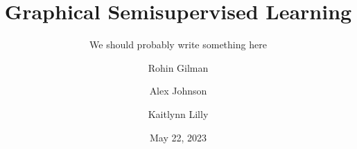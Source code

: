 \documentclass{beamer}
\title[GSSL]{Graphical Semisupervised Learning}
\subtitle{We should probably write something here}
\author{Rohin Gilman \and Alex Johnson \and Kaitlynn Lilly}
\date{May 22, 2023}
\begin{document}


\begin{frame}
    \maketitle
\end{frame}






\begin{comment}

    \begin{frame}{Text}
        \underline{This is underlined text.}

        \textit{This is italic text.}

        \textbf{This is bold text.}

        \texttt{This is mono-spaced text.}
    \end{frame}

    \begin{frame}{Lists}
        This is a bulleted list:
        \begin{itemize}
            \item An item

            \item Another item
            \begin{itemize}
                \item A subitem

                \item Another subitem
            \end{itemize}
        \end{itemize}

        This is a numbered list:
        \begin{enumerate}
            \item An item

            \item Another item
            \begin{enumerate}
                \item A subitem

                \item Another subitem
            \end{enumerate}
        \end{enumerate}
    \end{frame}


\end{comment}
\end{document}
